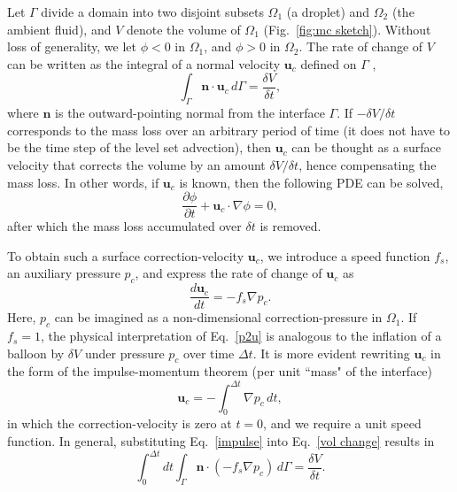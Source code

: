 Let $\Gamma$ divide a domain into two disjoint subsets $\Omega_1$ (\eg a droplet) and $\Omega_2$ (\eg the ambient fluid), and $V$ denote the volume of $\Omega_1$ (Fig.\ \ref{fig:mc sketch}). Without loss of generality, we let $\phi < 0 $ in $\Omega_1$, and $\phi > 0 $ in $\Omega_2$. The rate of change of $V$ can be written as the integral of a normal velocity ${\bm u}_c$ defined on $\Gamma$ \cite{Salac_CPC_2016}, \ie
\begin{equation}
    \int_\Gamma {\bm n} \cdot {\bm u}_c \,d\Gamma = \frac{\delta V}{\delta t},
  \label{vol change}
\end{equation}
where ${\bm n}$ is the outward-pointing normal from the interface $\Gamma$. If $-\delta V/\delta t$ corresponds to the mass loss over an arbitrary period of time (it does not have to be the time step of the level set advection), then ${\bm u}_c$ can be thought as a surface velocity that corrects the volume by an amount $\delta V/\delta t$, hence compensating the mass loss. In other words, if ${\bm u}_c$ is known, then the following PDE can be solved,
\begin{equation}
  \frac{\partial \phi}{\partial t} + {\bm u}_c \cdot \nabla \phi = 0,
  \label{inflation}
\end{equation}
after which the mass loss accumulated over $\delta t$ is removed.

To obtain such a surface correction-velocity ${\bm u}_c$, we introduce a speed function $f_s$, an auxiliary pressure $p_c$, and express the rate of change of ${\bm u}_c$ as
\begin{equation}
    \frac{d{\bm u}_c}{dt} = - f_s \nabla p_c.
  \label{p2u}
\end{equation}
Here, $p_c$ can be imagined as a non-dimensional correction-pressure in $\Omega_1$. If $f_s=1$, the physical interpretation of Eq.\ \eqref{p2u} is analogous to the inflation of a balloon by $\delta V$ under pressure $p_c$ over time $\Delta t$. It is more evident rewriting ${\bm u}_c$ in the form of the impulse-momentum theorem (per unit ``mass" of the interface)
\begin{equation}
    {\bm u}_c = -\int_{0}^{\Delta t} \nabla p_c \,dt,
  \label{impulse}
\end{equation}
in which the correction-velocity is zero at $t=0$, and we require a unit speed function. In general, substituting Eq.\ \eqref{impulse} into Eq.\ \eqref{vol change} results in
\begin{equation}
    \int_0^{\Delta t}dt \int_\Gamma {\bm n} \cdot (-f_s \nabla p_c) \,d\Gamma = \frac{\delta V}{\delta t}.
  \label{ICLS 1}
\end{equation}

